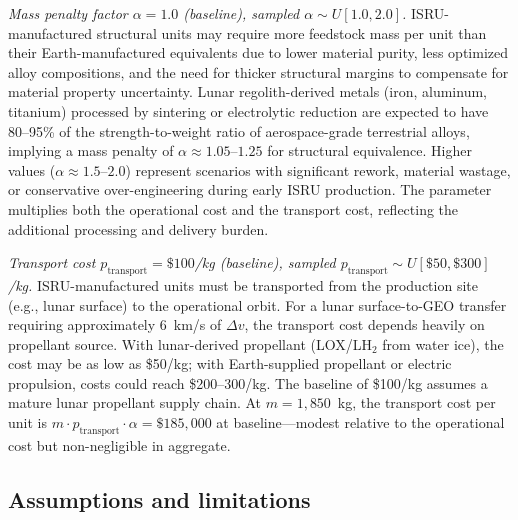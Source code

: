 \documentclass[preprint,12pt]{elsarticle}
\begin{document}
\emph{Mass penalty factor $\alpha = 1.0$ (baseline), sampled $\alpha \sim U[1.0, 2.0]$.} ISRU-manufactured structural units may require more feedstock mass per unit than their Earth-manufactured equivalents due to lower material purity, less optimized alloy compositions, and the need for thicker structural margins to compensate for material property uncertainty. Lunar regolith-derived metals (iron, aluminum, titanium) processed by sintering or electrolytic reduction are expected to have 80--95\% of the strength-to-weight ratio of aerospace-grade terrestrial alloys, implying a mass penalty of $\alpha \approx 1.05$--$1.25$ for structural equivalence. Higher values ($\alpha \approx 1.5$--$2.0$) represent scenarios with significant rework, material wastage, or conservative over-engineering during early ISRU production. The parameter multiplies both the operational cost and the transport cost, reflecting the additional processing and delivery burden.

\emph{Transport cost $p_{\mathrm{transport}} = \$100$/kg (baseline), sampled $p_{\mathrm{transport}} \sim U[\$50, \$300]$/kg.} ISRU-manufactured units must be transported from the production site (e.g., lunar surface) to the operational orbit. For a lunar surface-to-GEO transfer requiring approximately 6~km/s of $\Delta v$, the transport cost depends heavily on propellant source. With lunar-derived propellant (LOX/LH$_2$ from water ice), the cost may be as low as \$50/kg; with Earth-supplied propellant or electric propulsion, costs could reach \$200--300/kg. The baseline of \$100/kg assumes a mature lunar propellant supply chain. At $m = 1{,}850$~kg, the transport cost per unit is $m \cdot p_{\mathrm{transport}} \cdot \alpha = \$185{,}000$ at baseline---modest relative to the operational cost but non-negligible in aggregate.

\subsection{Assumptions and limitations}
\end{document}
